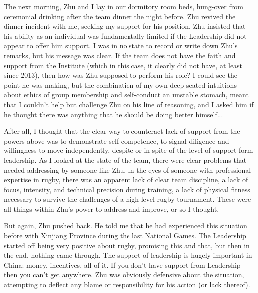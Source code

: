 \begin{CJK}{UTF8}{gbsn}
The next morning, Zhu and I lay in our dormitory room beds, hung-over from ceremonial drinking after the team dinner the night before.  Zhu revived the dinner incident with me, seeking my support for his position.  Zhu insisted that his ability as an individual was fundamentally limited if the Leadership did not appear to offer him support.  I was in no state to record or write down Zhu's remarks, but his message was clear. If the team does not have the faith and support from the Institute (which in this case, it clearly did not have, at least since 2013), then how was Zhu supposed to perform his role?   I could see the point he was making, but the combination of my own deep-seated intuitions about ethics of group membership and self-conduct an unstable stomach, meant that I couldn't help but challenge Zhu on his line of reasoning, and I asked him if he thought there was anything that he should be doing better himself...

After all, I thought that the clear way to counteract lack of support from the powers above was to demonstrate self-competence, to signal diligence and willingness to move independently, despite or in spite of the level of support form leadership.  As I looked at the state of the team, there were clear problems that needed addressing by someone like Zhu.  In the eyes of someone with professional expertise in rugby, there was an apparent lack of clear team discipline, a lack of focus, intensity, and technical precision during training, a lack of physical fitness necessary to survive the challenges of a high level rugby tournament.  These were all things within Zhu's power to address and improve, or so I thought.

But again, Zhu pushed back.  He told me that he had experienced this situation before with Xinjiang Province during the last National Games.  The Leadership started off being very positive about rugby, promising this and that, but then in the end, nothing came through.  The support of leadership is hugely important in China: money, incentives, all of it.  If you don't have support from Leadership then you can't get anywhere.  Zhu was obviously defensive about the situation, attempting to deflect any blame or responsibility for his action (or lack thereof).


\end{CJK}
